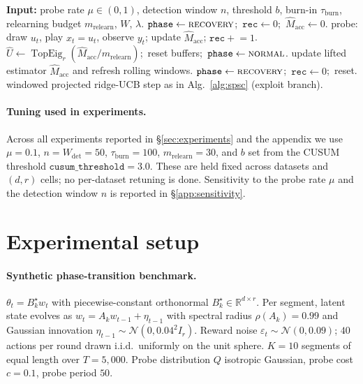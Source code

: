 \documentclass{article}
\newcommand{\R}{\mathbb{R}}
\DeclareMathOperator{\TopEig}{TopEig}
\begin{document}
\begin{algorithm}[H]
\caption{\textbf{SPSC-Adaptive}: unknown boundaries via CUSUM-style detection}
\label{alg:spsc_adaptive}
\begin{algorithmic}[1]
\State \textbf{Input:} probe rate $\mu\in(0,1)$, detection window $n$,
       threshold $b$, burn-in $\tau_{\mathrm{burn}}$, relearning budget $m_{\mathrm{relearn}}$, $W$, $\lambda$.
\State $\mathtt{phase}\leftarrow\textsc{recovery}$;\ $\mathtt{rec}\leftarrow 0$;\ $\widehat M_{\mathrm{acc}}\leftarrow 0$.
      \State probe: draw $u_t$, play $x_t=u_t$, observe $y_t$; update $\widehat M_{\mathrm{acc}}$; $\mathtt{rec}\mathrel{+}= 1$.
          \State $\widehat U\leftarrow \TopEig_r(\widehat M_{\mathrm{acc}}/m_{\mathrm{relearn}})$;\ reset buffers;\ $\mathtt{phase}\leftarrow\textsc{normal}$.
      \EndIf
  \Else{}
          \State update lifted estimator $\widehat M_{\mathrm{acc}}$ and refresh rolling windows.
              \State $\mathtt{phase}\leftarrow\textsc{recovery}$;\ $\mathtt{rec}\leftarrow 0$;\ reset.
          \EndIf
      \Else
          \State windowed projected ridge-UCB step as in Alg.~\ref{alg:spsc} (exploit branch).
      \EndIf
  \EndIf
\EndFor
\end{algorithmic}
\end{algorithm}

\paragraph{Tuning used in experiments.}
Across all experiments reported in \S\ref{sec:experiments} and the
appendix we use $\mu=0.1$, $n=W_{\mathrm{det}}=50$,
$\tau_{\mathrm{burn}}=100$, $m_{\mathrm{relearn}}=30$, and
$b$ set from the CUSUM threshold $\mathtt{cusum\_threshold}=3.0$.
These are held fixed across datasets and $(d,r)$ cells; no
per-dataset retuning is done. Sensitivity to the probe rate $\mu$
and the detection window $n$ is reported in
\S\ref{app:sensitivity}.

\section{Experimental setup}
\label{app:setup}

\paragraph{Synthetic phase-transition benchmark.}
$\theta_t = B_k^\star w_t$ with piecewise-constant orthonormal
$B_k^\star \in \R^{d\times r}$. Per segment, latent state evolves as
$w_t = A_k w_{t-1} + \eta_{t-1}$ with spectral radius $\rho(A_k) = 0.99$
and Gaussian innovation $\eta_{t-1}\sim\mathcal{N}(0, 0.04^2 I_r)$. Reward
noise $\varepsilon_t\sim\mathcal{N}(0,0.09)$; $40$ actions per round drawn
i.i.d.\ uniformly on the unit sphere. $K=10$ segments of equal length
over $T=5{,}000$. Probe distribution $Q$ isotropic Gaussian,
probe cost $c=0.1$, probe period $50$.
\end{document}
